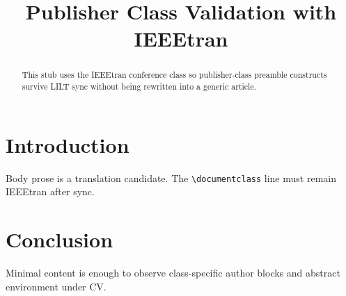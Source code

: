 \documentclass[conference]{IEEEtran}
\title{Publisher Class Validation with IEEEtran}
\author{
\IEEEauthorblockN{Validation Assets}
\IEEEauthorblockA{LILT Document Types Hub}
}
\date{}
\begin{document}
\maketitle

\begin{abstract}
This stub uses the IEEEtran conference class so publisher-class preamble
constructs survive LILT sync without being rewritten into a generic article.
\end{abstract}

\section{Introduction}
\label{sec:intro}

Body prose is a translation candidate. The \texttt{\textbackslash documentclass}
line must remain IEEEtran after sync.

\section{Conclusion}
\label{sec:concl}

Minimal content is enough to observe class-specific author blocks and
abstract environment under CV.
\end{document}
